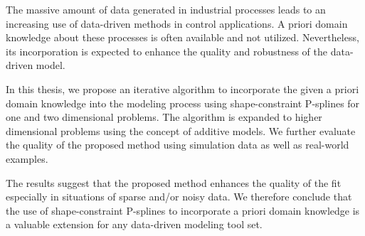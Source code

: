 

The massive amount of data generated in industrial processes leads to an increasing use of data-driven methods in control applications. A priori domain knowledge about these processes is often available and not utilized. Nevertheless, its incorporation is expected to enhance the quality  and robustness of the data-driven model. 

In this thesis, we propose an iterative algorithm to incorporate the given a priori domain knowledge into the modeling process using shape-constraint P-splines for one and two dimensional problems. The algorithm is expanded to higher dimensional problems using the concept of additive models. We further evaluate the quality of the proposed method using simulation data as well as real-world examples.

The results suggest that the proposed method enhances the quality of the fit especially in situations of sparse and/or noisy data. We therefore conclude that the use of shape-constraint P-splines to incorporate a priori domain knowledge is a valuable extension for any data-driven modeling tool set.



